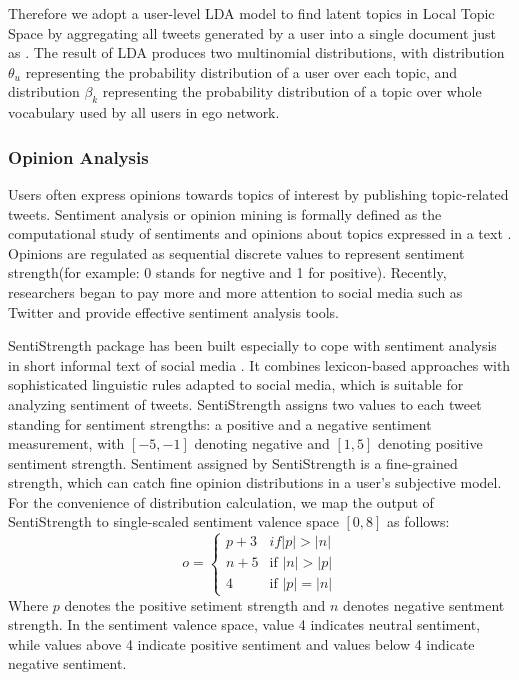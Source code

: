 \documentclass[letterpaper]{article}
\begin{document}
Therefore we adopt a user-level LDA model to find latent topics in Local Topic Space by aggregating all tweets generated by a user into a single document just as \cite{Hong:2010EST}. 
The result of LDA produces two multinomial distributions, with distribution $ \theta_{u} $ representing the probability distribution of a user over each topic, and distribution $ \beta_{k} $ representing the probability distribution of a topic over whole vocabulary used by all users in ego network. 

\subsubsection{Opinion Analysis}
\label{opinion}

Users often express opinions towards topics of interest by publishing topic-related tweets. 
Sentiment analysis or opinion mining is formally defined as the computational study of sentiments and opinions about topics expressed in a text \cite{liu2012sentiment}. Opinions are regulated as sequential discrete values to represent sentiment strength(for example: 0 stands for negtive and 1 for positive). Recently, researchers began to pay more and more attention to social media such as Twitter \cite{Thelwall:2010SSS,Thelwall:2012SSD,Hu:2013www} and provide effective sentiment analysis tools. 

SentiStrength package has been built especially to cope with sentiment analysis in short informal text of social media \cite{Thelwall:2010SSS}. 
It combines lexicon-based approaches with sophisticated linguistic rules adapted to social media, which is suitable for analyzing sentiment of tweets.
SentiStrength assigns two values to each tweet standing for sentiment strengths: a positive and a negative sentiment measurement, with $ \left[ -5,-1 \right]  $ denoting negative and $ \left[ 1,5 \right]  $ denoting positive sentiment strength.
Sentiment assigned by SentiStrength is a fine-grained strength, which can catch fine opinion distributions in a user's subjective model.  
For the convenience of distribution calculation, we map the output of SentiStrength to single-scaled sentiment valence space $ \left[ 0, 8 \right] $ as follows:
\begin{equation}
\label{opinionmap}
o= \left\{ 
\begin{array}{lll}
{p+3} & if \vert p \vert > \vert n \vert \\
{n+5} & \text{if } \vert n \vert > \vert p \vert \\
{4}  & \text{if } \vert p \vert = \vert n \vert
\end{array}
\right.
\end{equation}
Where $ p $ denotes the positive setiment strength and $ n $ denotes negative sentment strength.
In the sentiment valence space, value 4 indicates neutral sentiment, while values above 4 indicate positive sentiment and values below 4 indicate negative sentiment. 
\end{document}
